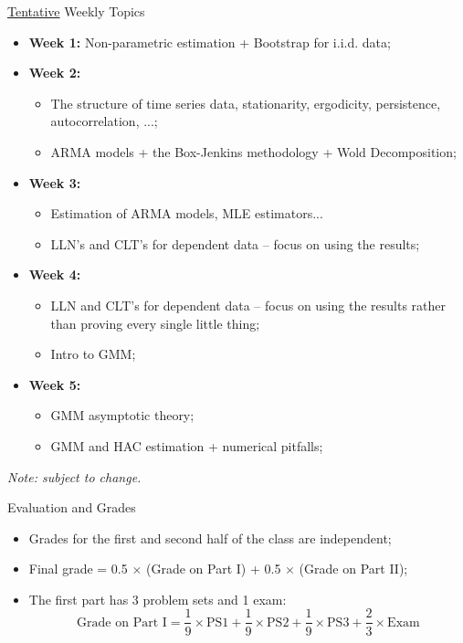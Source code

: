 \documentclass[aspectratio=169, xcolor=dvipsnames, 12pt]{beamer}
\begin{document}
\begin{frame}{\underline{Tentative} Weekly Topics}
  \begin{itemize}
    \item \textbf{Week 1:} Non-parametric estimation + Bootstrap for i.i.d. data;
    \item \textbf{Week 2:}
    \begin{itemize}
      \item The structure of time series data, stationarity, ergodicity, persistence, autocorrelation, ...;
      \item ARMA models + the Box-Jenkins methodology + Wold Decomposition;
    \end{itemize}
    \item \textbf{Week 3:} 
    \begin{itemize}
      \item Estimation of ARMA models, MLE estimators...
      \item LLN's and CLT's for dependent data -- focus on using the results;
    \end{itemize}
    \item \textbf{Week 4:} 
    \begin{itemize}
      \item LLN and CLT's for dependent data -- focus on using the results rather than proving every single little thing;
      \item Intro to GMM;
    \end{itemize}
    \item \textbf{Week 5:}
    \begin{itemize}
      \item GMM asymptotic theory;
      \item GMM and HAC estimation + numerical pitfalls;
  \end{itemize}
  \end{itemize}
  \vspace{1em}
  \textit{Note: subject to change.}
\end{frame}

\begin{frame}{Evaluation and Grades}
  \begin{itemize}
    \item Grades for the first and second half of the class are independent;
    \item Final grade = 0.5 $\times$ (Grade on Part I) + 0.5 $\times$ (Grade on Part II);
    \item The first part has 3 problem sets and 1 exam:
    \begin{equation}
      \text{Grade on Part I} = \frac{1}{9} \times \text{PS1} + \frac{1}{9} \times \text{PS2} + \frac{1}{9} \times \text{PS3} + \frac{2}{3} \times \text{Exam}
    \end{equation}
  \end{itemize}
\end{frame}
\end{document}
